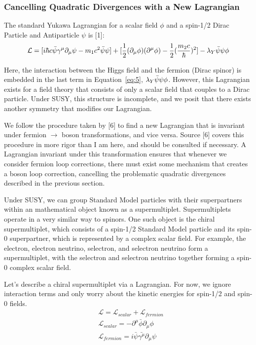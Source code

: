 \documentclass{article}
\begin{document}
\subsubsection{Cancelling Quadratic Divergences with a New Lagrangian}
The standard Yukawa Lagrangian for a scalar field $\phi$ and a spin-1/2 Dirac Particle and Antiparticle $\psi$ is [1]:
\begin{equation} \label{eq:6}
    {\mathcal{L}} = [i{\hbar}c\Bar{\psi}{\gamma^{\mu}}{\partial_{\mu}}\psi - m_{1}c^{2}\Bar{\psi}{\psi}] + [\frac{1}{2}(\partial_{\mu}\phi)(\partial^{\mu}\phi) - \frac{1}{2}(\frac{m_{2}c}{\hbar})^{2}] - {\lambda}_{Y}\Bar{\psi}\psi{\phi}
\end{equation}
\par
Here, the interaction between the Higgs field and the fermion (Dirac spinor) is embedded in the last term in Equation~\ref{eq:5}, $\lambda_{Y}\Bar{\psi}\psi{\phi}$. However, this Lagrangian exists for a field theory that consists of only a scalar field that couples to a Dirac particle. Under SUSY, this structure is incomplete, and we posit that there exists another symmetry that modifies our Lagrangian.
\par
We follow the procedure taken by [6] to find a new Lagrangian that is invariant under fermion $\rightarrow$ boson transformations, and vice versa. Source [6] covers this procedure in more rigor than I am here, and should be consulted if necessary. A Lagrangian invariant under this transformation ensures that whenever we consider fermion loop corrections, there must exist some mechanism that creates a boson loop correction, cancelling the problematic quadratic divergences described in the previous section.
\par
Under SUSY, we can group Standard Model particles with their superpartners within an mathematical object known as a supermultiplet. Supermultiplets operate in a very similar way to spinors. One such object is the chiral supermultiplet, which consists of a spin-1/2 Standard Model particle and its spin-0 superpartner, which is represented by a complex scalar field. For example, the electron, electron neutrino, selectron, and selectron neutrino form a supermultiplet, with the selectron and selectron neutrino together forming a spin-0 complex scalar field.
\par
Let's describe a chiral supermultiplet via a Lagrangian. For now, we ignore interaction terms and only worry about the kinetic energies for spin-1/2 and spin-0 fields.
\begin{equation} \label{eq:7}
    \begin{aligned}
    & {\mathcal{L}} = {\mathcal{L}_{scalar}} + {\mathcal{L}_{fermion}} \\
    & {\mathcal{L}_{scalar}} = -\partial^{\mu}\bar{\phi}\partial_{\mu}\phi \\
    & {\mathcal{L}_{fermion}} = i\bar{\psi}\bar{\gamma^{\mu}}\partial_{\mu}\psi
    \end{aligned}
\end{equation}
\end{document}
